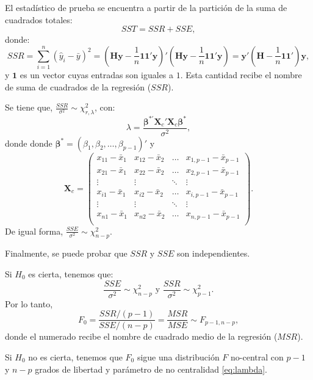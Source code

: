 \documentclass[
]{article}
\begin{document}
El estadístico de prueba se encuentra a partir de la partición de la suma de cuadrados totales:
\[
SST  = SSR + SSE,
\]
donde:
\[
SSR = \sum_{i=1}^{n}(\widehat{y}_{i}-\bar{y})^{2} = (\boldsymbol H\boldsymbol y- \frac{1}{n}\boldsymbol 1\boldsymbol 1'\boldsymbol y)'(\boldsymbol H\boldsymbol y- \frac{1}{n}\boldsymbol 1\boldsymbol 1'\boldsymbol y)=\boldsymbol y'(\boldsymbol H- \frac{1}{n}\boldsymbol 1\boldsymbol 1')\boldsymbol y,
\]
y \(\boldsymbol 1\) es un vector cuyas entradas son iguales a \(1\). Esta cantidad recibe el nombre de suma de cuadrados de la regresión (\(SSR\)).

Se tiene que, \(\frac{SSR}{\sigma^2} \sim \chi^2_{r,\lambda}\), con:
\begin{equation}
\lambda = \frac{\boldsymbol \beta^{*'}\boldsymbol X_{c}'\boldsymbol X_{c}\boldsymbol \beta^{*}}{\sigma^{2}},
\label{eq:lambda}
\end{equation}
donde donde \(\boldsymbol \beta^{*} = (\beta_{1},\beta_{2},\ldots,\beta_{p-1})'\) y
\[
\boldsymbol X_{c} = \begin{pmatrix}
x_{11} - \bar{x}_{1} & x_{12} - \bar{x}_{2} & \ldots & x_{1,p-1} - \bar{x}_{p-1} \\ 
  x_{21} - \bar{x}_{1} & x_{22} - \bar{x}_{2} & \ldots & x_{2,p-1} - \bar{x}_{p-1} \\ 
  \vdots & \vdots & \ddots & \vdots \\
  x_{i1} - \bar{x}_{1} & x_{i2} - \bar{x}_{2} & \ldots & x_{i,p-1} - \bar{x}_{p-1} \\ 
  \vdots & \vdots & \ddots & \vdots \\
  x_{n1} - \bar{x}_{1} & x_{n2} - \bar{x}_{2} & \ldots & x_{n,p-1} - \bar{x}_{p-1} \\ 
  \end{pmatrix}.
\]
De igual forma, \(\frac{SSE}{\sigma^2} \sim \chi^2_{n-p}\).

Finalmente, se puede probar que \(SSR\) y \(SSE\) son independientes.

Si \(H_{0}\) es cierta, tenemos que:
\[
\frac{SSE}{\sigma^{2}}\sim\chi^{2}_{n-p} \mbox{ y } \frac{SSR}{\sigma^{2}} \sim \chi^{2}_{p-1}.
\]
Por lo tanto,
\[
F_{0} = \frac{SSR/(p-1)}{SSE/(n-p)} =\frac{MSR}{MSE} \sim F_{p-1,n-p},
\]
donde el numerado recibe el nombre de cuadrado medio de la regresión (\(MSR\)).

Si \(H_{0}\) no es cierta, tenemos que \(F_{0}\) sigue una distribución \(F\) no-central con \(p-1\) y \(n-p\) grados de libertad y parámetro de no centralidad \eqref{eq:lambda}.
\end{document}
